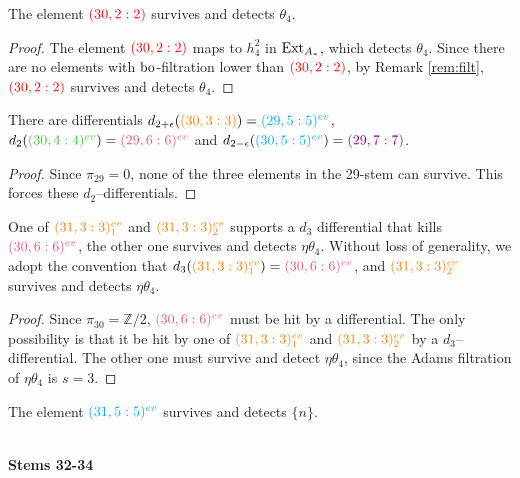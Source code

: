 \noindent

\begin{prop}
The element $\gdr{30}{2}{2}{red}$ survives and detects $\theta_4$.
\end{prop}

\begin{proof}
The element $\gdr{30}{2}{2}{red}$ maps to $h_4^2$ in $\Ex$, which detects $\theta_4$. Since there are no elements with $\bo$-filtration lower than $\gdr{30}{2}{2}{red}$, by Remark \ref{rem:filt}, $\gdr{30}{2}{2}{red}$ survives and detects $\theta_4$.
\end{proof}


\begin{prop} 
There are differentials
$d_{2+\epsilon}(\gdr{30}{3}{3}{orange}) =  \evr{29}{5}{cyan}$, $d_2(\evr{30}{4}{limegreen}) =  \evr{29}{6}{lavenderrose}$ and $d_{2-\epsilon}(\evr{30}{5}{cyan}) =  \gdr{29}{7}{7}{darkmagenta}$.
\end{prop}

\begin{proof}
Since $\pi_{29}=0$, none of the three elements in the 29-stem can survive. This forces these $d_2$--differentials.
\end{proof}

\begin{prop}
One of $\evrm{31}{3}{orange}{1}$ and $\evrm{31}{3}{orange}{2}$ supports a $d_3$ differential that kills $\evr{30}{6}{lavenderrose}$, the other one survives and detects $\eta\theta_4$. Without loss of generality, we adopt the convention that $d_3(\evrm{31}{3}{orange}{1}) = \evr{30}{6}{lavenderrose}$, and $\evrm{31}{3}{orange}{2}$ survives and detects $\eta\theta_4$.
\end{prop}


\begin{proof}
Since $\pi_{30}=\mathbb{Z}/2$, $\evr{30}{6}{lavenderrose}$ must be hit by a differential. The only possibility is that 
it be hit by
one of $\evrm{31}{3}{orange}{1}$ and $\evrm{31}{3}{orange}{2}$ by a $d_3$--differential. The other one must survive and detect $\eta\theta_4$, since the Adams filtration of $\eta\theta_4$ is $s=3$.
\end{proof}

\begin{cor}
The element $\evr{31}{5}{cyan}$ survives and detects $\{n\}$.
\end{cor}


\ \\
\noindent
{\bf Stems 32-34}

